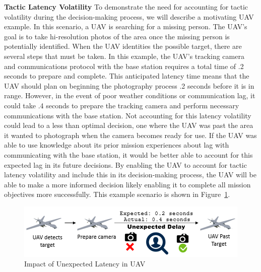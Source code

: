 \documentclass[11pt]{proposalnsf}
\newlength\q %
\begin{document}
\begin{sloppypar}
\vspace{3mm} \noindent \textbf{Tactic Latency Volatility} To demonstrate the need for accounting for tactic volatility during the decision-making process, we will describe a motivating UAV example. In this scenario, a UAV is searching for a missing person. The UAV's goal is to take hi-resolution photos of the area once the missing person is potentially identified. When the UAV identities the possible target, there are several steps that must be taken. In this example, the UAV's tracking camera and communications protocol with the base station requires a total time of .2 seconds to prepare and complete. This anticipated latency time means that the UAV should plan on beginning the photography process .2 seconds before it is in range. However, in the event of poor weather conditions or communication lag, it could take .4 seconds to prepare the tracking camera and perform necessary communications with the base station. Not accounting for this latency volatility could lead to a less than optimal decision, one where the UAV was past the area it wanted to photograph when the camera becomes ready for use. If the UAV was able to use knowledge about its prior mission experiences about lag with communicating with the base station, it would be better able to account for this expected lag in its future decisions. By enabling the UAV to account for tactic latency volatility and include this in its decision-making process, the UAV will be able to make a more informed decision likely enabling it to complete all mission objectives more successfully. This example scenario is shown in Figure~\ref{fig:UAVLatencyExampleCamera}. 



\begin{figure}[h]
	\centering
    \includegraphics[scale=0.9]{images/UAVLatencyExampleCamera.png}
    \caption{Impact of Unexpected Latency in UAV}
    \label{fig:UAVLatencyExampleCamera}
\end{figure}


\end{sloppypar}
\end{document}
